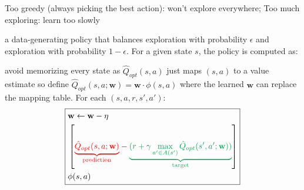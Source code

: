  Too greedy (always picking the best action):
won't explore everywhere; Too much exploring: learn too slowly

 a data-generating policy that balances exploration
with probability $\epsilon$ and exploration with probability $1-\epsilon$. For a
given state $s$, the policy is computed as:

 avoid memorizing every state as
$\hat{Q}_{opt}(s,a)$ just maps $(s,a)$ to a value estimate so define
$\hat{Q}_{opt}(s,a; \mathbf{w}) = \mathbf{w} \cdot \phi(s,a)$ where the learned
$\mathbf{w}$ can replace the mapping table.
For each $(s,a,r,s',a')$:
\begin{displaymath}
\boxed{
\begin{aligned}
    &\mathbf{w} \leftarrow \mathbf{w} - \eta \\
    &\left[
        \textcolor{red}{\underbrace{\hat{Q}_{opt}(s,a; \mathbf{w})}_{\text{prediction}}}
        - \textcolor{Green}{\underbrace{(r + \gamma \max_{a' \in A(s')}\hat{Q}_{opt}(s',a'; \mathbf{w}))}_{\text{target}}}
    \right] \\
    &\phi(s,a)
\end{aligned}
}
\end{displaymath}